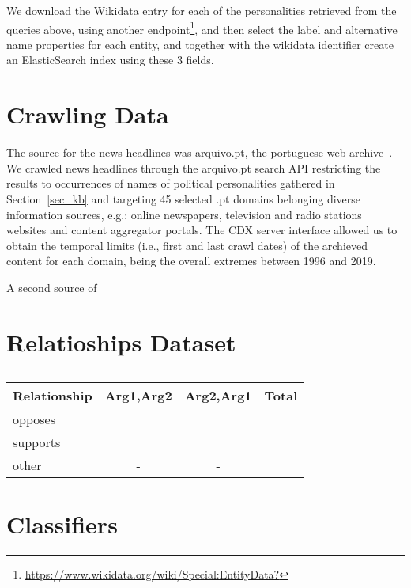 \documentclass[11pt,a4paper]{article}
\begin{document}
We download the Wikidata entry for each of the personalities retrieved from the 
queries above, using another endpoint\footnote{\url{https://www.wikidata.org/wiki/Special:EntityData?}},
and then select the label and alternative name properties for each entity, and together with the wikidata identifier
create an ElasticSearch index using these 3 fields.


\section{Crawling Data}
\label{sec:crawl}

The source for the news headlines was arquivo.pt, the portuguese web archive~\cite{SearchPastPWA2013}. We crawled news headlines through the arquivo.pt search API restricting the results to occurrences of names of political personalities gathered in Section~\ref{sec_kb} and targeting 45 selected .pt domains belonging diverse information sources, e.g.: online newspapers, television and radio stations websites and content aggregator portals. The CDX server interface allowed us to obtain the temporal limits (i.e., first and last crawl dates) of the archieved content for each domain, being the overall extremes between 1996 and 2019.

A second source of 







\section{Relatioships Dataset}
\label{subsubsec:rel_data_annot}


\begin{table}[!h]
\centering
\begin{tabular}{lccr}
\hline \textbf{Relationship} & \textbf{Arg1,Arg2} & \textbf{Arg2,Arg1} & \textbf{Total} \\ \hline
opposes        &   &     \\
supports       &   &     \\
other          & - & - & \\
\hline
\end{tabular}
\caption{\label{font-table}  }
\end{table}

\section{Classifiers}
\end{document}

